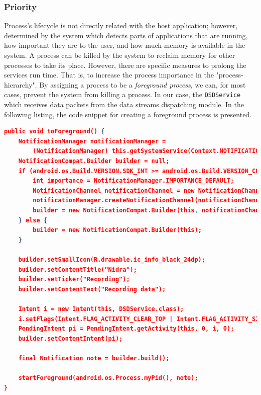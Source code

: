 \subsubsection{Priority}
Process's lifecycle is not directly related with the host application; however, determined by the system which detects parts of applications that are running, how important they are to the user, and how much memory is available in the system. A process can be killed by the system to reclaim memory for other processes to take its place. However, there are specific measures to prolong the services run time. That is, to increase the process importance in the "process-hierarchy". By assigning a process to be a \textit{foreground process}, we can, for most cases, prevent the system from killing a process. In our case, the \verb|DSDService| which receives data packets from the data streams dispatching module. In the following listing, the code snippet for creating a foreground process is presented.

\begin{lstlisting}[language=json, caption={}, captionpos=b]
public void toForeground() {
    NotificationManager notificationManager = 
        (NotificationManager) this.getSystemService(Context.NOTIFICATION_SERVICE);
    NotificationCompat.Builder builder = null;
    if (android.os.Build.VERSION.SDK_INT >= android.os.Build.VERSION_CODES.O) {
        int importance = NotificationManager.IMPORTANCE_DEFAULT;
        NotificationChannel notificationChannel = new NotificationChannel("ID", "Name", importance);
        notificationManager.createNotificationChannel(notificationChannel);
        builder = new NotificationCompat.Builder(this, notificationChannel.getId());
    } else {
        builder = new NotificationCompat.Builder(this);
    }

    builder.setSmallIcon(R.drawable.ic_info_black_24dp);
    builder.setContentTitle("Nidra");
    builder.setTicker("Recording");
    builder.setContentText("Recording data");

    Intent i = new Intent(this, DSDService.class);
    i.setFlags(Intent.FLAG_ACTIVITY_CLEAR_TOP | Intent.FLAG_ACTIVITY_SINGLE_TOP);
    PendingIntent pi = PendingIntent.getActivity(this, 0, i, 0);
    builder.setContentIntent(pi);

    final Notification note = builder.build();

    startForeground(android.os.Process.myPid(), note);
}
\end{lstlisting}

